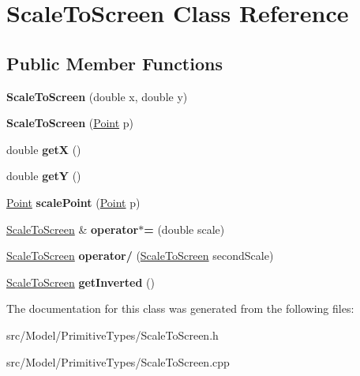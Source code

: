 \hypertarget{classScaleToScreen}{}\section{Scale\+To\+Screen Class Reference}
\label{classScaleToScreen}
\subsection*{Public Member Functions}
\begin{DoxyCompactItemize}
\item 
{\bfseries Scale\+To\+Screen} (double x, double y)\hypertarget{classScaleToScreen_aa1d9e3cc6d547e7058b018502f038f36}{}\label{classScaleToScreen_aa1d9e3cc6d547e7058b018502f038f36}

\item 
{\bfseries Scale\+To\+Screen} (\hyperlink{classPoint}{Point} p)\hypertarget{classScaleToScreen_a4e8f7f5da2f7a4555e413aae89c440f5}{}\label{classScaleToScreen_a4e8f7f5da2f7a4555e413aae89c440f5}

\item 
double {\bfseries getX} ()\hypertarget{classScaleToScreen_a23c6b37d5c05c89b73ec9cb719f45585}{}\label{classScaleToScreen_a23c6b37d5c05c89b73ec9cb719f45585}

\item 
double {\bfseries getY} ()\hypertarget{classScaleToScreen_a0a729018210df6ee4a0e5eaffc6b00a9}{}\label{classScaleToScreen_a0a729018210df6ee4a0e5eaffc6b00a9}

\item 
\hyperlink{classPoint}{Point} {\bfseries scale\+Point} (\hyperlink{classPoint}{Point} p)\hypertarget{classScaleToScreen_a3fedaae5d381d9ff312fb6bad4e2fb8d}{}\label{classScaleToScreen_a3fedaae5d381d9ff312fb6bad4e2fb8d}

\item 
\hyperlink{classScaleToScreen}{Scale\+To\+Screen} \& {\bfseries operator$\ast$=} (double scale)\hypertarget{classScaleToScreen_aeb61e223cb9cab1718a061a8222bce1a}{}\label{classScaleToScreen_aeb61e223cb9cab1718a061a8222bce1a}

\item 
\hyperlink{classScaleToScreen}{Scale\+To\+Screen} {\bfseries operator/} (\hyperlink{classScaleToScreen}{Scale\+To\+Screen} second\+Scale)\hypertarget{classScaleToScreen_a424bdbb790645629d70f8adb7ae2b675}{}\label{classScaleToScreen_a424bdbb790645629d70f8adb7ae2b675}

\item 
\hyperlink{classScaleToScreen}{Scale\+To\+Screen} {\bfseries get\+Inverted} ()\hypertarget{classScaleToScreen_a11bf6af66d32a9d204f20aae36d17382}{}\label{classScaleToScreen_a11bf6af66d32a9d204f20aae36d17382}

\end{DoxyCompactItemize}


The documentation for this class was generated from the following files\+:\begin{DoxyCompactItemize}
\item 
src/\+Model/\+Primitive\+Types/Scale\+To\+Screen.\+h\item 
src/\+Model/\+Primitive\+Types/Scale\+To\+Screen.\+cpp\end{DoxyCompactItemize}
